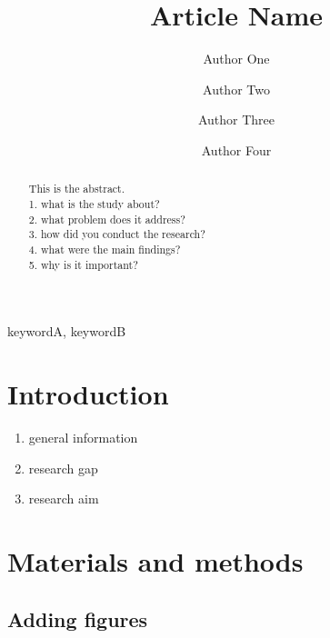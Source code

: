 \documentclass[review]{elsarticle} %
\providecommand{\tightlist}{%
  \setlength{\itemsep}{0pt}\setlength{\parskip}{0pt}}
\begin{document}
\begin{frontmatter}

  \title{Article Name}
    \author[a,1]{Author One}
    \author[a,b]{Author Two}
    \author[c]{Author Three}
    \author[a]{Author Four}
      \address[a]{Graduate School of Engineering, Nagasaki University, 1-14 Bunkyo-machi,
Nagasaki 852-8521, Japan}
    \address[b]{Department, University, Street, City, State, Zip}
    \address[c]{Department, University, Street, City, State, Zip}
  
  \begin{abstract}
  This is the abstract.\\
  1. what is the study about?\\
  2. what problem does it address?\\
  3. how did you conduct the research?\\
  4. what were the main findings?\\
  5. why is it important?
  \end{abstract}
   \begin{keyword} keywordA, keywordB\end{keyword}
 \end{frontmatter}

\newpage

\section{Introduction}\label{intro}

\begin{enumerate}
\def\labelenumi{\arabic{enumi}.}
\tightlist
\item
  general information
\item
  research gap
\item
  research aim
\end{enumerate}

\section{Materials and methods}\label{method}

\subsection{Adding figures}\label{figure}
\end{document}
